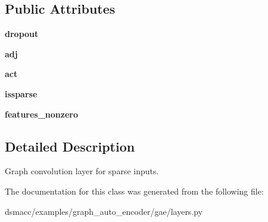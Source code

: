 \subsection*{Public Attributes}
\begin{DoxyCompactItemize}
\item 
\mbox{\label{classdsmacc_1_1examples_1_1graph__auto__encoder_1_1gae_1_1layers_1_1GraphConvolutionSparse_a8259eb0a211822552d339efab67931ef}} 
{\bfseries dropout}
\item 
\mbox{\label{classdsmacc_1_1examples_1_1graph__auto__encoder_1_1gae_1_1layers_1_1GraphConvolutionSparse_a71be0989851c0f9c4bb11c54d18d7ca5}} 
{\bfseries adj}
\item 
\mbox{\label{classdsmacc_1_1examples_1_1graph__auto__encoder_1_1gae_1_1layers_1_1GraphConvolutionSparse_a8a45535056e1853d30eeeb2486f97849}} 
{\bfseries act}
\item 
\mbox{\label{classdsmacc_1_1examples_1_1graph__auto__encoder_1_1gae_1_1layers_1_1GraphConvolutionSparse_a6674a5311dd0bb1619b488e521175544}} 
{\bfseries issparse}
\item 
\mbox{\label{classdsmacc_1_1examples_1_1graph__auto__encoder_1_1gae_1_1layers_1_1GraphConvolutionSparse_a923c9f9aeec99a8b1784b2b239f00b0b}} 
{\bfseries features\+\_\+nonzero}
\end{DoxyCompactItemize}


\subsection{Detailed Description}
\begin{DoxyVerb}Graph convolution layer for sparse inputs.\end{DoxyVerb}
 

The documentation for this class was generated from the following file\+:\begin{DoxyCompactItemize}
\item 
dsmacc/examples/graph\+\_\+auto\+\_\+encoder/gae/layers.\+py\end{DoxyCompactItemize}
